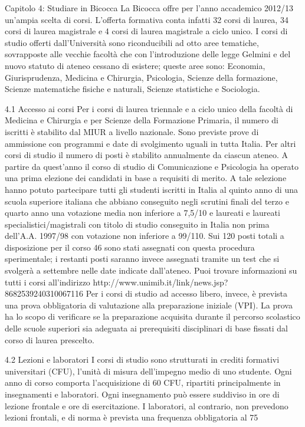 Capitolo 4: Studiare in Bicocca
La Bicocca offre per l'anno accademico 2012/13 un'ampia scelta di corsi. L'offerta formativa conta infatti 32 corsi di laurea, 34 corsi di laurea magistrale e 4 corsi di laurea magistrale a ciclo unico. I corsi di studio offerti dall'Università sono riconducibili ad otto aree tematiche, sovrapposte alle vecchie facoltà che  con l'introduzione delle legge Gelmini e del nuovo statuto di ateneo cessano di esistere; queste aree sono: Economia, Giurisprudenza, Medicina e Chirurgia, Psicologia, Scienze della formazione, Scienze matematiche fisiche e naturali, Scienze statistiche e Sociologia. 

4.1 Accesso ai corsi 
Per i corsi di laurea triennale e a ciclo unico della facoltà di Medicina e Chirurgia e per Scienze della Formazione Primaria, il numero di iscritti è stabilito dal MIUR a livello nazionale. Sono previste prove di ammissione con programmi e date di svolgimento uguali in tutta Italia. Per altri corsi di studio il numero di posti è stabilito annualmente da ciascun ateneo. A partire da quest'anno il corso di studio di Comunicazione e Psicologia ha operato una prima elezione dei candidati in base a requisiti di merito. A tale selezione hanno potuto partecipare tutti gli studenti iscritti in Italia al quinto anno di una scuola superiore italiana che abbiano conseguito negli scrutini finali del terzo e quarto anno una votazione media non inferiore a 7,5/10 e laureati e laureati specialistici/magistrali con titolo di studio conseguito in Italia non prima dell'A.A. 1997/98 con votazione non inferiore a 99/110. Sui 120 posti totali a disposizione per il corso 46 sono stati assegnati con questa procedura sperimentale; i restanti posti saranno invece assegnati tramite un test che si svolgerà a settembre nelle date indicate dall'ateneo.
Puoi trovare informazioni su tutti i corsi all'indirizzo http://www.unimib.it/link/news.jsp?8682539240310067116
Per i corsi di studio ad accesso libero, invece, è prevista una prova obbligatoria di valutazione alla preparazione iniziale (VPI). La prova ha lo scopo di verificare se la preparazione acquisita durante il percorso scolastico delle scuole superiori sia adeguata ai prerequisiti disciplinari di base fissati dal corso di laurea prescelto. 

4.2 Lezioni e laboratori 
I corsi di studio sono strutturati in crediti formativi universitari (CFU), l'unità di misura dell'impegno medio di uno studente. Ogni anno di corso comporta l'acquisizione di 60 CFU, ripartiti principalmente in insegnamenti e laboratori. Ogni insegnamento può essere suddiviso in ore di lezione frontale e ore di esercitazione. I laboratori, al contrario, non prevedono lezioni frontali, e di norma è prevista una frequenza obbligatoria al 75%

